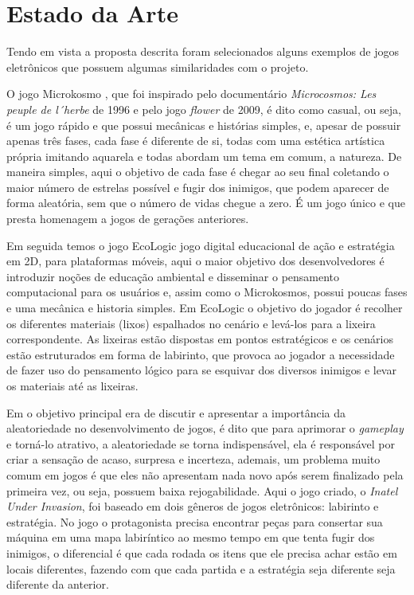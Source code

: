 \documentclass[12pt]{article}
\begin{document}
\section{Estado da Arte}

Tendo em vista a proposta descrita foram selecionados alguns exemplos de jogos eletrônicos que possuem algumas similaridades com o projeto.

O jogo Microkosmo \cite{lunardellimikrokosmos}, que foi inspirado pelo documentário\emph{ Microcosmos: Les peuple de l´herbe} de 1996 e pelo jogo \emph{flower} de 2009, é dito como casual, ou seja, é um jogo rápido e que possui  mecânicas e histórias simples, e, apesar de possuir apenas três fases, cada fase é diferente de si, todas com uma estética artística própria imitando aquarela e  todas abordam um tema em comum, a natureza. De maneira simples, aqui o objetivo de cada fase é chegar ao seu final coletando o maior número de estrelas possível e fugir dos inimigos, que podem aparecer de forma aleatória, sem que o número de vidas chegue a zero. É um jogo único e que presta homenagem a jogos de gerações anteriores. 

Em seguida temos o jogo EcoLogic \cite{de2018ecologic} jogo digital educacional de ação e estratégia em 2D, para plataformas móveis, aqui o maior objetivo dos desenvolvedores é introduzir noções de educação ambiental e disseminar o pensamento computacional para os usuários e, assim como o Microkosmos, possui poucas fases e uma mecânica e historia simples. Em EcoLogic o objetivo do jogador é recolher os diferentes materiais (lixos) espalhados no cenário e levá-los para a lixeira correspondente. As lixeiras estão dispostas em pontos estratégicos e os cenários estão estruturados em forma de labirinto, que provoca ao jogador a necessidade de fazer uso do pensamento lógico para se esquivar dos diversos inimigos e levar os materiais até as lixeiras.

Em \cite{correaimportancia} o objetivo principal era de discutir e apresentar a importância da aleatoriedade no desenvolvimento de jogos, é dito que para aprimorar o \emph{gameplay} e torná-lo atrativo, a aleatoriedade se torna indispensável, ela é responsável por criar a sensação de acaso, surpresa e incerteza, ademais, um problema muito comum em jogos é que eles não apresentam nada novo após serem finalizado pela primeira vez, ou seja, possuem baixa rejogabilidade. Aqui o jogo criado, o \emph{Inatel Under Invasion}, foi baseado em dois gêneros de jogos eletrônicos: labirinto e estratégia. No jogo o protagonista precisa encontrar peças para consertar sua máquina em uma mapa labiríntico ao mesmo tempo em que tenta fugir dos inimigos, o diferencial é que cada rodada os itens que ele precisa achar estão em locais diferentes, fazendo com  que cada partida e a estratégia seja diferente seja diferente da anterior.
\end{document}
